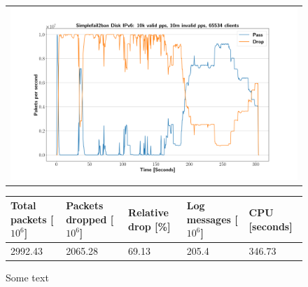 \begin{figure}[p]
	\label{fig:simplefail2ban:disk:ip6:10m}
	\centering
	\scriptsize
	\begin{tabular}{c}
    	\centerline{\includegraphics[width=1.2\textwidth]{images/simplefail2ban_disk_ipv6_v10k_iv10m_c65534.png}}
	\end{tabular}
	\begin{tabular}{lllll}
		\toprule
		\textbf{Total packets [$10^6$]} & \textbf{Packets dropped [$10^6$]} & \textbf{Relative drop [\%]} & \textbf{Log messages [$10^6$]} & \textbf{CPU [seconds]} \\ \midrule 
		2992.43 & 2065.28 & 69.13 & 205.4 & 346.73 \\
		\bottomrule
	\end{tabular}
	\caption[Simplefail2ban Logfile IPv6 10m PPS]{Some text}
\end{figure}

